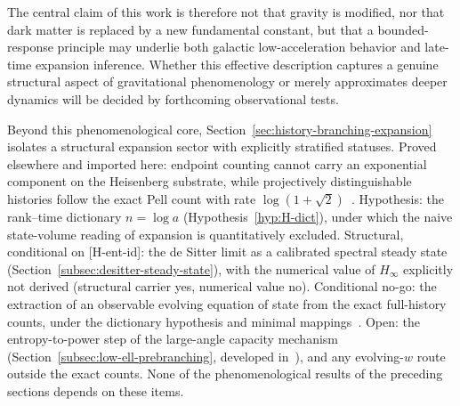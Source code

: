   The central claim of this work is therefore not that gravity is modified,
  nor that dark matter is replaced by a new fundamental constant,
  but that a bounded-response principle may underlie both galactic
  low-acceleration behavior and late-time expansion inference.
  Whether this effective description captures a genuine structural aspect
  of gravitational phenomenology or merely approximates deeper dynamics
  will be decided by forthcoming observational tests.

  Beyond this phenomenological core, Section~\ref{sec:history-branching-expansion} isolates a structural
  expansion sector with explicitly stratified statuses.
  Proved elsewhere and imported here: endpoint counting cannot carry an exponential component on the
  Heisenberg substrate, while projectively distinguishable histories follow the exact Pell count with rate
  $\log(1+\sqrt2)$~\cite{Beau2026tb}.
  Hypothesis: the rank--time dictionary $n=\log a$ (Hypothesis~\ref{hyp:H-dict}), under which the naive
  state-volume reading of expansion is quantitatively excluded.
  Structural, conditional on [H-ent-id]: the de Sitter limit as a calibrated spectral steady state
  (Section~\ref{subsec:desitter-steady-state}), with the numerical value of $H_\infty$ explicitly not
  derived (structural carrier yes, numerical value no).
  Conditional no-go: the extraction of an observable evolving equation of state from the exact full-history
  counts, under the dictionary hypothesis and minimal mappings~\cite{Beau2026tb}.
  Open: the entropy-to-power step of the large-angle capacity mechanism
  (Section~\ref{subsec:low-ell-prebranching}, developed in~\cite{Beau2026dhc}), and any evolving-$w$ route
  outside the exact counts.
  None of the phenomenological results of the preceding sections depends on these items.

